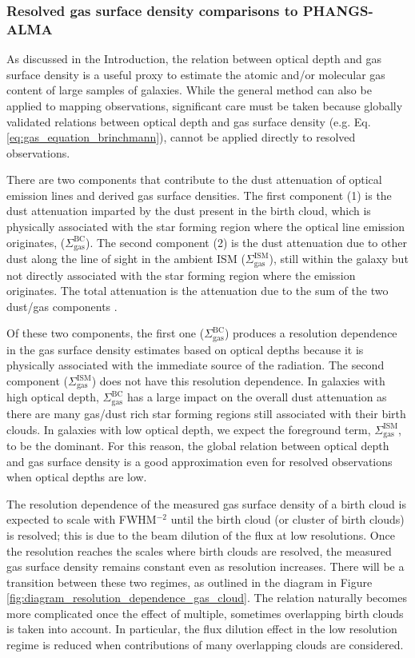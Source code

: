 \documentclass[fleqn,usenatbib]{mnras}
\begin{document}
\subsubsection{Resolved gas surface density comparisons to PHANGS-ALMA}
As discussed in the Introduction, the relation between optical depth and gas surface density is a useful proxy to estimate the atomic and/or molecular gas content of large samples of galaxies. While the general method can also be applied to mapping  observations, significant care must be taken because globally validated relations between optical depth and gas surface density (e.g.  Eq. \ref{eq:gas_equation_brinchmann}), cannot be applied directly to resolved observations.

There are two components that contribute to the dust attenuation of optical emission lines and derived gas surface densities. The first component (1) is the dust attenuation imparted by the dust present in the birth cloud, which is physically associated with the star forming region where the optical line emission originates, ($\Sigma_{\textrm{gas}}^{\textrm{BC}}$). The second component (2) is the dust attenuation due to other dust along the line of sight in the ambient ISM ($\Sigma_{\textrm{gas}}^{\textrm{ISM}}$), still within the galaxy but not directly associated with the star forming region where the emission originates. The total attenuation is the attenuation due to the sum of the two dust/gas components \citep[][]{calzetti1994, calzetti2000, charlot2000}.

Of these two components, the first one ($\Sigma_{\textrm{gas}}^{\textrm{BC}}$) produces a resolution dependence in the gas surface density estimates based on optical depths because it is physically associated with the immediate source of the radiation. The second component ($\Sigma_{\textrm{gas}}^{\textrm{ISM}}$) does not have this resolution dependence. In galaxies with high optical depth, $\Sigma_{\textrm{gas}}^{\textrm{BC}}$ has a large impact on the overall dust attenuation as there are many gas/dust rich star forming regions still associated with their birth clouds. In galaxies with low optical depth, we expect the foreground term, $\Sigma_{\textrm{gas}}^{\textrm{ISM}}$, to be the dominant. For this reason, the global relation between optical depth and gas surface density is a good approximation even for resolved observations when optical depths are low. 

The resolution dependence of the measured gas surface density of a birth cloud is expected to scale with FWHM$^{-2}$ until the birth cloud (or cluster of birth clouds) is resolved; this is due to the beam dilution of the flux at low resolutions. Once the resolution reaches the scales where birth clouds are resolved, the measured gas surface density remains constant even as resolution increases. There will be a transition between these two regimes,  as outlined in the diagram in Figure \ref{fig:diagram_resolution_dependence_gas_cloud}. The relation naturally becomes more complicated once the effect of multiple, sometimes overlapping birth clouds is taken into account. In particular, the flux dilution effect in the low resolution regime is reduced when contributions of many overlapping clouds are considered. 
\end{document}
